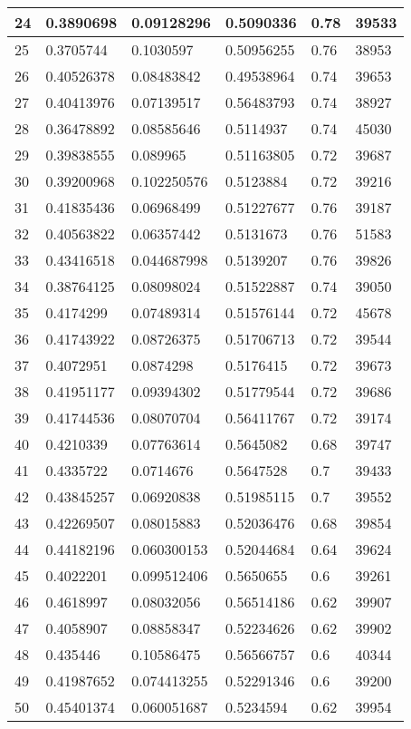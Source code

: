 \begin{longtable}{|l|l|l|l|l|l|}
24 & 0.3890698 & 0.09128296 & 0.5090336 & 0.78 & 39533 \\ \hline 
25 & 0.3705744 & 0.1030597 & 0.50956255 & 0.76 & 38953 \\ \hline 
26 & 0.40526378 & 0.08483842 & 0.49538964 & 0.74 & 39653 \\ \hline 
27 & 0.40413976 & 0.07139517 & 0.56483793 & 0.74 & 38927 \\ \hline 
28 & 0.36478892 & 0.08585646 & 0.5114937 & 0.74 & 45030 \\ \hline 
29 & 0.39838555 & 0.089965 & 0.51163805 & 0.72 & 39687 \\ \hline 
30 & 0.39200968 & 0.102250576 & 0.5123884 & 0.72 & 39216 \\ \hline 
31 & 0.41835436 & 0.06968499 & 0.51227677 & 0.76 & 39187 \\ \hline 
32 & 0.40563822 & 0.06357442 & 0.5131673 & 0.76 & 51583 \\ \hline 
33 & 0.43416518 & 0.044687998 & 0.5139207 & 0.76 & 39826 \\ \hline 
34 & 0.38764125 & 0.08098024 & 0.51522887 & 0.74 & 39050 \\ \hline 
35 & 0.4174299 & 0.07489314 & 0.51576144 & 0.72 & 45678 \\ \hline 
36 & 0.41743922 & 0.08726375 & 0.51706713 & 0.72 & 39544 \\ \hline 
37 & 0.4072951 & 0.0874298 & 0.5176415 & 0.72 & 39673 \\ \hline 
38 & 0.41951177 & 0.09394302 & 0.51779544 & 0.72 & 39686 \\ \hline 
39 & 0.41744536 & 0.08070704 & 0.56411767 & 0.72 & 39174 \\ \hline 
40 & 0.4210339 & 0.07763614 & 0.5645082 & 0.68 & 39747 \\ \hline 
41 & 0.4335722 & 0.0714676 & 0.5647528 & 0.7 & 39433 \\ \hline 
42 & 0.43845257 & 0.06920838 & 0.51985115 & 0.7 & 39552 \\ \hline 
43 & 0.42269507 & 0.08015883 & 0.52036476 & 0.68 & 39854 \\ \hline 
44 & 0.44182196 & 0.060300153 & 0.52044684 & 0.64 & 39624 \\ \hline 
45 & 0.4022201 & 0.099512406 & 0.5650655 & 0.6 & 39261 \\ \hline 
46 & 0.4618997 & 0.08032056 & 0.56514186 & 0.62 & 39907 \\ \hline 
47 & 0.4058907 & 0.08858347 & 0.52234626 & 0.62 & 39902 \\ \hline 
48 & 0.435446 & 0.10586475 & 0.56566757 & 0.6 & 40344 \\ \hline 
49 & 0.41987652 & 0.074413255 & 0.52291346 & 0.6 & 39200 \\ \hline 
50 & 0.45401374 & 0.060051687 & 0.5234594 & 0.62 & 39954 \\ \hline 
\end{longtable}